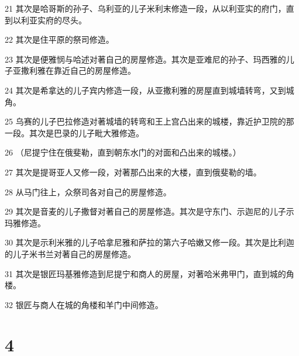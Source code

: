 \par 21 其次是哈哥斯的孙子、乌利亚的儿子米利末修造一段，从以利亚实的府门，直到以利亚实府的尽头。
\par 22 其次是住平原的祭司修造。
\par 23 其次是便雅悯与哈述对著自己的房屋修造。其次是亚难尼的孙子、玛西雅的儿子亚撒利雅在靠近自己的房屋修造。
\par 24 其次是希拿达的儿子宾内修造一段，从亚撒利雅的房屋直到城墙转弯，又到城角。
\par 25 乌赛的儿子巴拉修造对著城墙的转弯和王上宫凸出来的城楼，靠近护卫院的那一段。其次是巴录的儿子毗大雅修造。
\par 26 （尼提宁住在俄斐勒，直到朝东水门的对面和凸出来的城楼。）
\par 27 其次是提哥亚人又修一段，对著那凸出来的大楼，直到俄斐勒的墙。
\par 28 从马门往上，众祭司各对自己的房屋修造。
\par 29 其次是音麦的儿子撒督对著自己的房屋修造。其次是守东门、示迦尼的儿子示玛雅修造。
\par 30 其次是示利米雅的儿子哈拿尼雅和萨拉的第六子哈嫩又修一段。其次是比利迦的儿子米书兰对著自己的房屋修造。
\par 31 其次是银匠玛基雅修造到尼提宁和商人的房屋，对著哈米弗甲门，直到城的角楼。
\par 32 银匠与商人在城的角楼和羊门中间修造。

\chapter{4}

